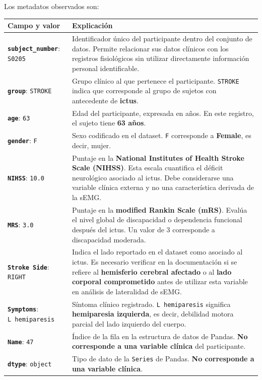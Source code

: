 \documentclass[
  spanish,
  a4paper,
  DIV=11,
  numbers=noendperiod]{scrreprt}
\newcounter{none} %
\begin{document}
Los metadatos observados son:

{\def\LTcaptype{none} %
\begin{longtable}[]{@{}
  >{\raggedright\arraybackslash}p{}
  >{\raggedright\arraybackslash}p{}@{}}
\toprule\noalign{}
\begin{minipage}[b]{\linewidth}\raggedright
Campo y valor
\end{minipage} & \begin{minipage}[b]{\linewidth}\raggedright
Explicación
\end{minipage} \\
\midrule\noalign{}
\endhead
\bottomrule\noalign{}
\endlastfoot
\textbf{\texttt{subject\_number}}: \texttt{S0205} & Identificador único
del participante dentro del conjunto de datos. Permite relacionar sus
datos clínicos con los registros fisiológicos sin utilizar directamente
información personal identificable. \\
\textbf{\texttt{group}}: \texttt{STROKE} & Grupo clínico al que
pertenece el participante. \texttt{STROKE} indica que corresponde al
grupo de sujetos con antecedente de \textbf{ictus}. \\
\textbf{\texttt{age}}: \texttt{63} & Edad del participante, expresada en
años. En este registro, el sujeto tiene \textbf{63 años}. \\
\textbf{\texttt{gender}}: \texttt{F} & Sexo codificado en el dataset.
\texttt{F} corresponde a \textbf{Female}, es decir, mujer. \\
\textbf{\texttt{NIHSS}}: \texttt{10.0} & Puntaje en la \textbf{National
Institutes of Health Stroke Scale (NIHSS)}. Esta escala cuantifica el
déficit neurológico asociado al ictus. Debe considerarse una variable
clínica externa y no una característica derivada de la sEMG. \\
\textbf{\texttt{MRS}}: \texttt{3.0} & Puntaje en la \textbf{modified
Rankin Scale (mRS)}. Evalúa el nivel global de discapacidad o
dependencia funcional después del ictus. Un valor de 3 corresponde a
discapacidad moderada. \\
\textbf{\texttt{Stroke\ Side}}: \texttt{RIGHT} & Indica el lado
reportado en el dataset como asociado al ictus. Es necesario verificar
en la documentación si se refiere al \textbf{hemisferio cerebral
afectado} o al \textbf{lado corporal comprometido} antes de utilizar
esta variable en análisis de lateralidad de sEMG. \\
\textbf{\texttt{Symptoms}}: \texttt{L\ hemiparesis} & Síntoma clínico
registrado. \texttt{L\ hemiparesis} significa \textbf{hemiparesia
izquierda}, es decir, debilidad motora parcial del lado izquierdo del
cuerpo. \\
\textbf{\texttt{Name}}: \texttt{47} & Índice de la fila en la estructura
de datos de Pandas. \textbf{No corresponde a una variable clínica} del
participante. \\
\textbf{\texttt{dtype}}: \texttt{object} & Tipo de dato de la
\texttt{Series} de Pandas. \textbf{No corresponde a una variable
clínica}. \\
\end{longtable}
}
\end{document}
